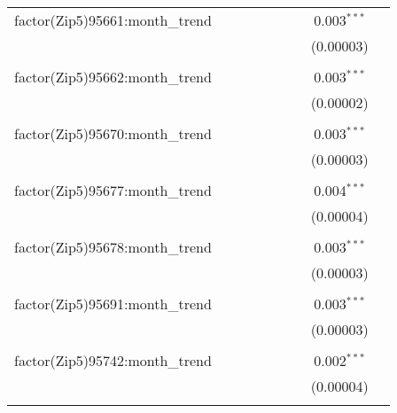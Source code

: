 \begin{table}[H]
{\begin{tabular}{@{\extracolsep{5pt}}lcccccccc}
  factor(Zip5)95661:month\_trend &  &  &  &  &  &  & 0.003$^{***}$ &  \\  

   &  &  &  &  &  &  & (0.00003) &  \\  

   & & & & & & & & \\  

  factor(Zip5)95662:month\_trend &  &  &  &  &  &  & 0.003$^{***}$ &  \\  

   &  &  &  &  &  &  & (0.00002) &  \\  

   & & & & & & & & \\  

  factor(Zip5)95670:month\_trend &  &  &  &  &  &  & 0.003$^{***}$ &  \\  

   &  &  &  &  &  &  & (0.00003) &  \\  

   & & & & & & & & \\  

  factor(Zip5)95677:month\_trend &  &  &  &  &  &  & 0.004$^{***}$ &  \\  

   &  &  &  &  &  &  & (0.00004) &  \\  

   & & & & & & & & \\  

  factor(Zip5)95678:month\_trend &  &  &  &  &  &  & 0.003$^{***}$ &  \\  

   &  &  &  &  &  &  & (0.00003) &  \\  

   & & & & & & & & \\  

  factor(Zip5)95691:month\_trend &  &  &  &  &  &  & 0.003$^{***}$ &  \\  

   &  &  &  &  &  &  & (0.00003) &  \\  

   & & & & & & & & \\  

  factor(Zip5)95742:month\_trend &  &  &  &  &  &  & 0.002$^{***}$ &  \\  

   &  &  &  &  &  &  & (0.00004) &  \\  

   & & & & & & & & \\  


\end{tabular}}
\end{table}
